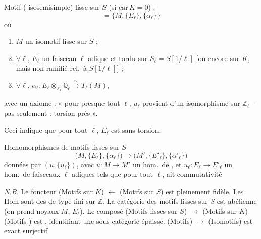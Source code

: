\documentclass[11pt,a4paper]{article}
\begin{document}
Motif (\struck{\ill{}} isosemisimple) lisse sur $S$ (si $\mathrm{car}\, K = 0$) :
\[
= \bigl\{ M, \{E_{\ell}\}, \{\alpha_{\ell}\} \bigr\}
\]
où
\begin{enumerate}
  \item[a)] $M$ un isomotif lisse sur $S$ ;
  \item[b)] $\forall \ell$, $E_{\ell}$ un faisceau $\ell$-adique et tordu sur $S_{\ell} = S[1/\ell]$ [ou encore sur $K$, mais non ramifié rel.\ à $S[1/\ell]$] ;
  \item[c)] $\forall \ell$, $\alpha_{\ell}\colon E_{\ell} \otimes_{\mathbb{Z}_{\ell}} \mathbb{Q}_{\ell} \xrightarrow{\ \sim\ } T_{\ell}(M)$,
\end{enumerate}
avec un axiome : « pour presque tout $\ell$, $u_{\ell}$ provient d'un isomorphisme sur $\mathbb{Z}_{\ell}$ -- pas seulement : torsion près ».

Ceci indique que pour  tout $\ell$, $E_{\ell}$ est sans torsion.

Homomorphismes de motifs lisses sur $S$
\[
\bigl(M, \{E_{\ell}\}, \{\alpha_{\ell}\}\bigr) \to \bigl(M', \{E'_{\ell}\}, \{\alpha'_{\ell}\}\bigr)
\]
données par $(u, \{u_{\ell}\})$, avec $u\colon M \to M'$ un hom.\ de , et $u_{\ell}\colon E_{\ell} \to E'_{\ell}$ un hom.\ de faisceaux $\ell$-adiques tels que pour tout $\ell$,  ait commutativité 


\emph{N.B.} Le foncteur \struck{\ill{}} (Motifs sur $K$) $\longleftarrow$ (Motifs  sur $S$) est pleinement fidèle.
 Les Hom sont des  de type fini sur $\mathbb{Z}$. La catégorie des motifs lisses sur $S$ est abélienne (on prend \struck{\ill{}} noyaux   \ill{} \ill{} $M$, $E_{\ell}$). \struck{\ill{}} Le composé  (Motifs lisses sur $S$) $\to$ (Motifs sur $K$)
 (Motifs  \ill{}) est   , identifiant  une sous-catégorie épaisse.    (Motifs) $\to$ (Isomotifs)  est exact  surjectif
\end{document}
